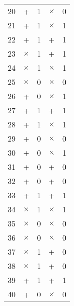 \begin{longtable}{c|cc|cc}
  20     & +                          & 1                       & $\times$ & 0   \\
  21     & +                          & 1                       & $\times$ & 1   \\
  22     & +                          & 1                       & +        & 1   \\
  23     & $\times$                   & 1                       & +        & 1   \\
  24     & $\times$                   & 1                       & $\times$ & 1   \\
  25     & $\times$                   & 0                       & $\times$ & 0   \\
  26     & +                          & 0                       & $\times$ & 1   \\
  27     & +                          & 1                       & +        & 1   \\
  28     & +                          & 1                       & $\times$ & 1   \\
  29     & +                          & 0                       & $\times$ & 0   \\
  30     & +                          & 0                       & $\times$ & 1   \\
  31     & +                          & 0                       & +        & 0   \\
  32     & +                          & 0                       & +        & 0   \\
  33     & +                          & 1                       & +        & 1   \\
  34     & $\times$                   & 1                       & $\times$ & 1   \\
  35     & $\times$                   & 0                       & $\times$ & 0   \\
  36     & $\times$                   & 0                       & $\times$ & 0   \\
  37     & $\times$                   & 1                       & +        & 0   \\
  38     & $\times$                   & 1                       & +        & 0   \\
  39     & +                          & 1                       & +        & 1   \\
  40     & +                          & 0                       & $\times$ & 0   \\

\end{longtable}
